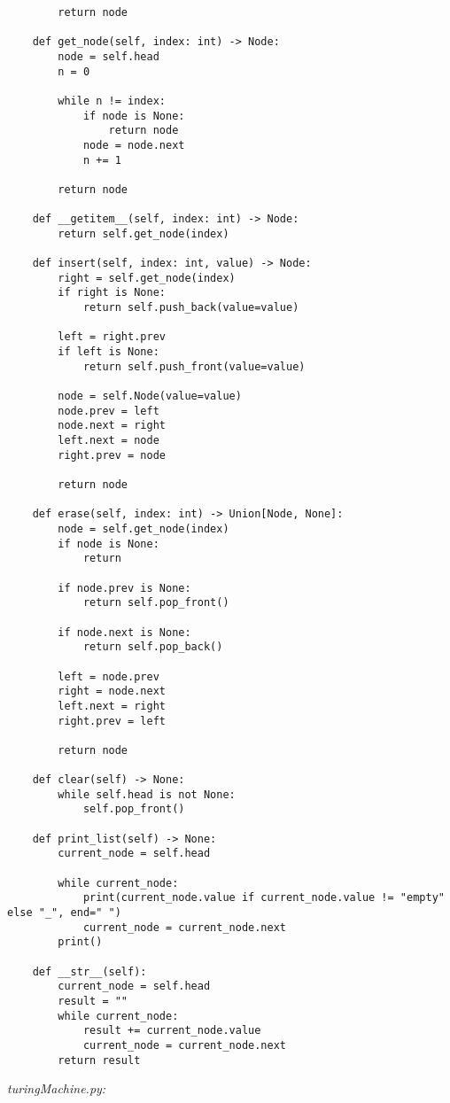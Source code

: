 \begin{lstlisting}
        return node

    def get_node(self, index: int) -> Node:
        node = self.head
        n = 0

        while n != index:
            if node is None:
                return node
            node = node.next
            n += 1

        return node

    def __getitem__(self, index: int) -> Node:
        return self.get_node(index)

    def insert(self, index: int, value) -> Node:
        right = self.get_node(index)
        if right is None:
            return self.push_back(value=value)

        left = right.prev
        if left is None:
            return self.push_front(value=value)

        node = self.Node(value=value)
        node.prev = left
        node.next = right
        left.next = node
        right.prev = node

        return node

    def erase(self, index: int) -> Union[Node, None]:
        node = self.get_node(index)
        if node is None:
            return

        if node.prev is None:
            return self.pop_front()

        if node.next is None:
            return self.pop_back()

        left = node.prev
        right = node.next
        left.next = right
        right.prev = left

        return node

    def clear(self) -> None:
        while self.head is not None:
            self.pop_front()

    def print_list(self) -> None:
        current_node = self.head

        while current_node:
            print(current_node.value if current_node.value != "empty" else "_", end=" ")
            current_node = current_node.next
        print()

    def __str__(self):
        current_node = self.head
        result = ""
        while current_node:
            result += current_node.value
            current_node = current_node.next
        return result
\end{lstlisting}


\textit{turingMachine.py:}


